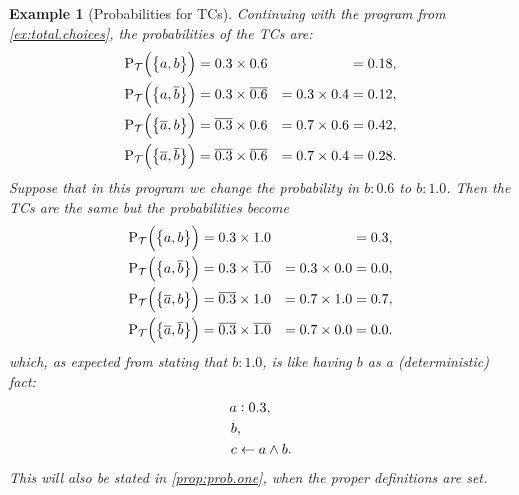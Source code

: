 \documentclass[a4paper]{article}
\newtheorem{example}{Example}
\newtheorem{example}{Example}
\newcommand{\eat}[1]{}
\newcommand{\at}[1]{\ensuremath{\!\del{#1}}}        %
\newcommand{\cla}[1]{\ensuremath{{\cal #1}}}        %
\newcommand{\clause}{\ensuremath{\leftarrow}}
\newcommand{\co}[1]{\ensuremath{\overline{#1}}}     %
\newcommand{\TCHOICEset}{\ensuremath{\cla{T}}}
\newcommand{\prfunc}{\ensuremath{\mathrm{P}}}
\newcommand{\prd}[1]{\ensuremath{\prfunc_{#1}}}
\newcommand{\prT}{\prd{\TCHOICEset}}
\newcommand{\probfact}[2]{\ensuremath{#1:#2}}
\begin{document}
\begin{example}[Probabilities for \aclp{TC}]%
  \label{ex:probability.total.choices}%
  \em Continuing with the program from \cref{ex:total.choices}, the
  probabilities of the \aclp{TC} are:
  \begin{equation*}
    \begin{aligned}
            \prT\at{\set[1]{a, b}}           & = 0.3 \times 0.6           &                  & = 0.18, \\
            \prT\at{\set[1]{a, \co{b}}}      & = 0.3 \times \co{0.6}      & = 0.3 \times 0.4 & = 0.12, \\
            \prT\at{\set[1]{\co{a}, b}}      & = \co{0.3} \times 0.6      & = 0.7 \times 0.6 & = 0.42, \\
            \prT\at{\set[1]{\co{a}, \co{b}}} & = \co{0.3} \times \co{0.6} & = 0.7 \times 0.4 & = 0.28.
    \end{aligned}
  \end{equation*}
  \eat{ The total choices corresponding to the stable models of the
    program above are \( \co{a}\co{b}\co{c}, ab\co{c}, a\co{b}c. \)
    The probability of $t = \co{a}\co{b}\co{c}$ is \(0.7\) ? } %
  Suppose that in this program we change the probability in
  \(\probfact{b}{0.6}\) to \(\probfact{b}{1.0}\).  Then the \aclp{TC}
  are the same but the probabilities become
  \begin{equation*}
    \begin{aligned}
            \prT\at{\set[1]{a, b}}           & = 0.3 \times 1.0           &                  & = 0.3, \\
            \prT\at{\set[1]{a, \co{b}}}      & = 0.3 \times \co{1.0}      & = 0.3 \times 0.0 & = 0.0, \\
            \prT\at{\set[1]{\co{a}, b}}      & = \co{0.3} \times 1.0      & = 0.7 \times 1.0 & = 0.7, \\
            \prT\at{\set[1]{\co{a}, \co{b}}} & = \co{0.3} \times \co{1.0} & = 0.7 \times 0.0 & = 0.0.
    \end{aligned}
  \end{equation*}
  which, as expected from stating that \(\probfact{b}{1.0}\), is like
  having \(b\) as a (deterministic) fact:
  \begin{equation*}
    \begin{split}
            \probfact{a&}{0.3}, \\
            b &, \\
            c & \clause a \wedge b.
    \end{split}
  \end{equation*}
  This will also be stated in \cref{prop:prob.one}, when the proper
  definitions are set.
\end{example}
\end{document}
